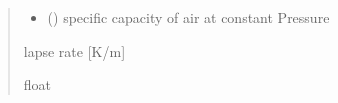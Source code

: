 \documentclass[letterpaper,10pt,english]{sphinxmanual}
\begin{document}
\begin{fulllineitems}
\begin{quote}
\begin{description}
\begin{itemize}
\item {} 
\sphinxAtStartPar
{} () \textendash{} specific capacity of air at constant Pressure

\end{itemize}

\sphinxAtStartPar
{} \textendash{} lapse rate {[}K/m{]}

\sphinxAtStartPar
float

\end{description}\end{quote}

\end{fulllineitems}

\end{document}
